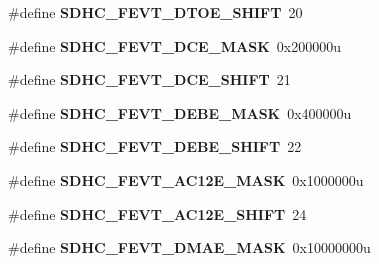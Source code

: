 \begin{DoxyCompactItemize}
\item 
\#define {\bfseries S\+D\+H\+C\+\_\+\+F\+E\+V\+T\+\_\+\+D\+T\+O\+E\+\_\+\+S\+H\+I\+FT}~20\hypertarget{group__SDHC__Register__Masks_gad96cef6ac842de516e11f7e9e519408f}{}\label{group__SDHC__Register__Masks_gad96cef6ac842de516e11f7e9e519408f}

\item 
\#define {\bfseries S\+D\+H\+C\+\_\+\+F\+E\+V\+T\+\_\+\+D\+C\+E\+\_\+\+M\+A\+SK}~0x200000u\hypertarget{group__SDHC__Register__Masks_ga544e27b3392401737744fa5a291685e3}{}\label{group__SDHC__Register__Masks_ga544e27b3392401737744fa5a291685e3}

\item 
\#define {\bfseries S\+D\+H\+C\+\_\+\+F\+E\+V\+T\+\_\+\+D\+C\+E\+\_\+\+S\+H\+I\+FT}~21\hypertarget{group__SDHC__Register__Masks_gaa4f8f70316d6254d3c69c4a0d767646e}{}\label{group__SDHC__Register__Masks_gaa4f8f70316d6254d3c69c4a0d767646e}

\item 
\#define {\bfseries S\+D\+H\+C\+\_\+\+F\+E\+V\+T\+\_\+\+D\+E\+B\+E\+\_\+\+M\+A\+SK}~0x400000u\hypertarget{group__SDHC__Register__Masks_gac409de67d8fb1f25c2d250922180f666}{}\label{group__SDHC__Register__Masks_gac409de67d8fb1f25c2d250922180f666}

\item 
\#define {\bfseries S\+D\+H\+C\+\_\+\+F\+E\+V\+T\+\_\+\+D\+E\+B\+E\+\_\+\+S\+H\+I\+FT}~22\hypertarget{group__SDHC__Register__Masks_ga2524f7345007e20b9788e9b83874c225}{}\label{group__SDHC__Register__Masks_ga2524f7345007e20b9788e9b83874c225}

\item 
\#define {\bfseries S\+D\+H\+C\+\_\+\+F\+E\+V\+T\+\_\+\+A\+C12\+E\+\_\+\+M\+A\+SK}~0x1000000u\hypertarget{group__SDHC__Register__Masks_gadbf12dd087ee8570d4d9efd31f565bc9}{}\label{group__SDHC__Register__Masks_gadbf12dd087ee8570d4d9efd31f565bc9}

\item 
\#define {\bfseries S\+D\+H\+C\+\_\+\+F\+E\+V\+T\+\_\+\+A\+C12\+E\+\_\+\+S\+H\+I\+FT}~24\hypertarget{group__SDHC__Register__Masks_ga932a5cd108d0f4bf80df9559c2c671e2}{}\label{group__SDHC__Register__Masks_ga932a5cd108d0f4bf80df9559c2c671e2}

\item 
\#define {\bfseries S\+D\+H\+C\+\_\+\+F\+E\+V\+T\+\_\+\+D\+M\+A\+E\+\_\+\+M\+A\+SK}~0x10000000u\hypertarget{group__SDHC__Register__Masks_gad91681b40c16fc4d1fcefe155d3437cb}{}\label{group__SDHC__Register__Masks_gad91681b40c16fc4d1fcefe155d3437cb}


\end{DoxyCompactItemize}
